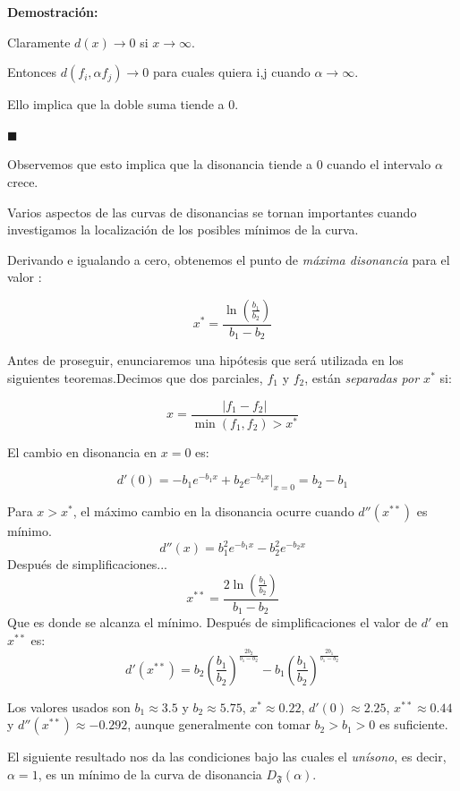 \documentclass[11pt,a4paper]{article}
\begin{document}
	\noindent\textbf{Demostración:} 

Claramente $d(x) \rightarrow 0$ si $x \rightarrow \infty$.

Entonces $d(f_i, \alpha f_j) \rightarrow 0$ para cuales quiera i,j cuando $\alpha \rightarrow \infty$. 

Ello implica que la doble suma tiende a 0.       

$\blacksquare$

Observemos que esto implica que la disonancia tiende a 0 cuando el intervalo $\alpha$ crece.

Varios aspectos de las curvas de disonancias se tornan importantes cuando investigamos la localización de los posibles mínimos de la curva. 

Derivando e igualando a cero, obtenemos el punto de \emph{máxima disonancia} para el valor : 

 $$
    x^{*} = \frac{\ln(\frac{b_1}{b_2})}{b_1-b_2}
 $$

Antes de proseguir, enunciaremos una hipótesis que será utilizada en los siguientes teoremas.Decimos que dos parciales, $f_1$ y $f_2$, están \emph{separadas por $x^{*}$} si:

$$
    x = \frac{ | f_1 - f_2 | }{\min(f_1, f_2) > x^{*}} 
$$


El cambio en disonancia en $x = 0$ es:

$$
    d'(0) = -b_1 e^{-b_1 x} + b_2 e^{-b_2 x} |_{x = 0} = b_2 - b_1 
$$

Para $ x > x^{*} $, el máximo cambio en la disonancia ocurre cuando $ d''(x^{**})$ es mínimo.
$$ d''(x) = b_1^2 e^{-b_1 x} - b_2^2 e^{-b_2 x}$$
Después de simplificaciones...
$$ x^{**} = \frac{2 \ln\left(\frac{b_1}{b_2}\right)}{b_1 - b_2} $$
Que es donde se alcanza el mínimo. Después de simplificaciones el valor de $d'$ en $x^{**}$ es:
$$ d'(x^{**}) = b_2 \left(\frac{b_1}{b_2}\right)^{\frac{2 b_2}{b_1 - b_2}} - b_1 \left(\frac{b_1}{b_2}\right)^{\frac{2 b_1}{b_1 - b_2}}    $$

Los valores usados son $b_1 \approx 3.5$ y $b_2 \approx 5.75$, $x^{*} \approx 0.22$, $d'(0) \approx 2.25$, $x^{**} \approx 0.44$ y $d''(x^{**}) \approx -0.292$, aunque generalmente con tomar $b_2 > b_1 > 0$ es suficiente.

El siguiente resultado nos da las condiciones bajo las cuales el \emph{unísono}, es decir, $\alpha = 1$, es un mínimo de la curva de disonancia $D_{\mathfrak{F}} (\alpha)$.

\end{document}
